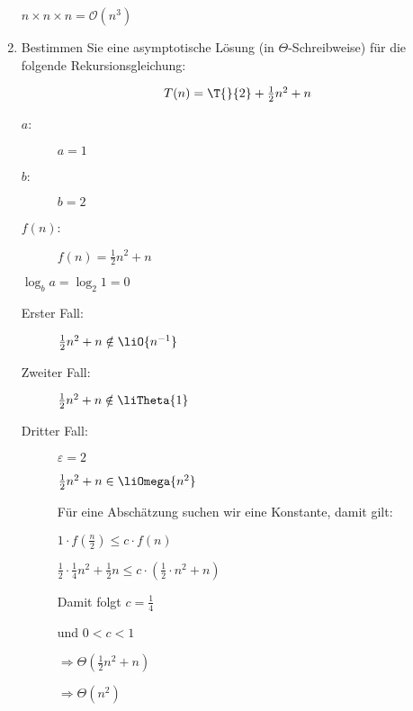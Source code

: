 \documentclass{lehramt-informatik-aufgabe}
\begin{document}
\begin{enumerate}
\begin{liAntwort}
$n \times n \times n = \mathcal{O}(n^3)$
\end{liAntwort}


\item Bestimmen Sie eine asymptotische Lösung (in $\Theta$-Schreibweise)
für die folgende Rekursionsgleichung:

\def\fn{\textstyle{\frac{1}{2}}n^2 + n}

\begin{displaymath}
T(n) = \T{}{2} + \fn
\end{displaymath}

\begin{liAntwort}

\liRekursionsGleichung

\begin{description}
\item[$a$:] $a = 1$
\item[$b$:] $b = 2$
\item[$f(n)$:] $f(n) = \fn$
\end{description}

$\log_b a = \log_2 1 = 0$

\begin{description}
\item[Erster Fall:]

\liBedingungEins

$\fn \notin \liO{n^{-1}}$

\item[Zweiter Fall:]

\liBedingungZwei

$\fn \notin \liTheta{1}$

\item[Dritter Fall:]

\liBedingungDrei

$\varepsilon = 2$

$\fn \in \liOmega{n^2}$

Für eine Abschätzung suchen wir eine Konstante, damit gilt:

$1 \cdot f(\frac{n}{2}) \leq c \cdot f(n)$

$\frac{1}{2} \cdot \frac{1}{4} n^2 + \frac{1}{2}n  \leq c \cdot (\frac{1}{2} \cdot n^2 + n)$

Damit folgt $c = \frac{1}{4}$

und $0 < c < 1$

$\Rightarrow \Theta(\frac{1}{2}n^2 + n)$

$\Rightarrow \Theta(n^2)$
\end{description}
\end{liAntwort}
\end{enumerate}
\end{document}
